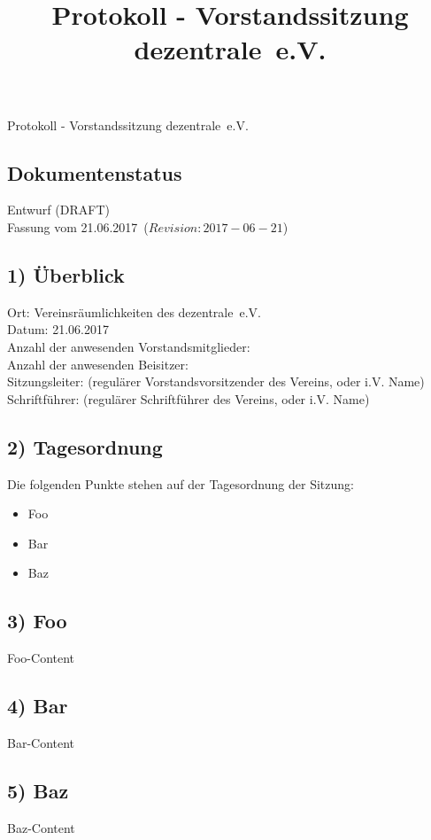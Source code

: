 \documentclass[10pt,a4paper]{scrartcl}
\newcommand{\qs}[1]{\glqq#1\grqq}
\newcommand{\name}{dezentrale}
\newcommand{\revision}{$Revision: 2017-06-21$}
\newcommand{\eventdate}{21.06.2017}
\newcommand{\sitzungsleiter}{(regul{\"a}rer Vorstandsvorsitzender des Vereins, oder i.V. Name)}
\newcommand{\schriftfuehrer}{(regul{\"a}rer Schriftf{\"u}hrer des Vereins, oder i.V. Name)}
\newcommand{\documentstatus}{Entwurf (DRAFT)}
\begin{document}
\title{Protokoll - Vorstandssitzung \qs{\name\ e.V.}}
{\LARGE Protokoll - Vorstandssitzung \qs{\name\ e.V.}}

\subsection*{Dokumentenstatus}
\documentstatus\\
Fassung vom \eventdate\ (\revision)

\subsection*{1) {\"U}berblick}
    Ort: Vereinsr{\"a}umlichkeiten des \name\ e.V.\\
    Datum: \eventdate\\
	Anzahl der anwesenden Vorstandsmitglieder: \\
	Anzahl der anwesenden Beisitzer: \\
    Sitzungsleiter: \sitzungsleiter\\
    Schriftf{\"u}hrer: \schriftfuehrer

\subsection*{2) Tagesordnung}
    Die folgenden Punkte stehen auf der Tagesordnung der Sitzung:
	\begin{itemize}
        \item Foo
        \item Bar
        \item Baz
    \end{itemize}

\subsection*{3) Foo}
    Foo-Content

\subsection*{4) Bar}
    Bar-Content

\subsection*{5) Baz}
    Baz-Content
\end{document}

